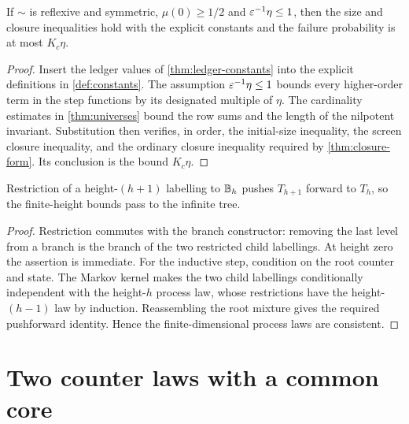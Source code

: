 \begin{theorem}
\label{thm:numeric}
\leanok
{}
If $\sim$ is reflexive and symmetric, $\mu(0)\geq1/2$ and $\varepsilon^{-1}\eta\leq1$, then the size
and closure inequalities hold with the explicit constants and the failure probability is at most
$K_c\eta$.
\end{theorem}

\begin{proof}
\leanok
{}
Insert the ledger values of \cref{thm:ledger-constants} into the explicit definitions in
\cref{def:constants}. The assumption $\varepsilon^{-1}\eta\leq1$ bounds every higher-order term in the
step functions by its designated multiple of $\eta$. The cardinality estimates in
\cref{thm:universes} bound the row sums and the length of the nilpotent invariant. Substitution
then verifies, in order, the initial-size inequality, the screen closure inequality, and the
ordinary closure inequality required by \cref{thm:closure-form}. Its conclusion is the bound
$K_c\eta$.
\end{proof}

\begin{lemma}
\label{thm:marginal-consistency}
\leanok
Restriction of a height-$(h+1)$ labelling to $\mathbb{B}_h$ pushes $T_{h+1}$ forward to $T_h$, so the
finite-height bounds pass to the infinite tree.
\end{lemma}

\begin{proof}
\leanok
Restriction commutes with the branch constructor: removing the last level from a branch is the
branch of the two restricted child labellings. At height zero the assertion is immediate. For the
inductive step, condition on the root counter and state. The Markov kernel makes the two child
labellings conditionally independent with the height-$h$ process law, whose restrictions have the
height-$(h-1)$ law by induction. Reassembling the root mixture gives the required pushforward
identity. Hence the finite-dimensional process laws are consistent.
\end{proof}

\section{Two counter laws with a common core}

